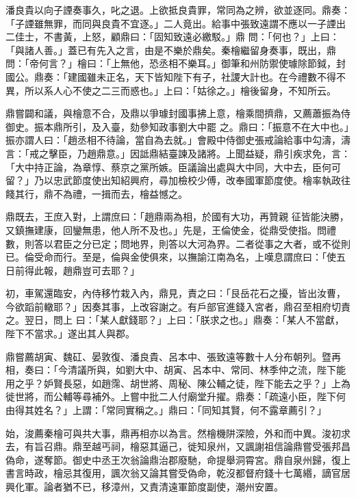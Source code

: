 \begin{pinyinscope}
 潘良貴以向子諲奏事久，叱之退。上欲抵良貴罪，常同為之辨，欲並逐同。鼎奏：「子諲雖無罪，而同與良貴不宜逐。」二人竟出。給事中張致遠謂不應以一子諲出二佳士，不書黃，上怒，顧鼎曰：「固知致遠必繳駁。」鼎
 問：「何也？」上曰：「與諸人善。」蓋已有先入之言，由是不樂於鼎矣。秦檜繼留身奏事，既出，鼎問：「帝何言？」檜曰：「上無他，恐丞相不樂耳。」御筆和州防禦使璩除節鉞，封國公。鼎奏：「建國雖未正名，天下皆知陛下有子，社謖大計也。在今禮數不得不異，所以系人心不使之二三而惑也。」上曰：「姑徐之。」檜後留身，不知所云。



 鼎嘗闢和議，與檜意不合，及鼎以爭璩封國事拂上意，檜乘間擠鼎，又薦蕭振為侍御史。振本鼎所引，及入臺，劾參知政事劉大中罷
 之。鼎曰：「振意不在大中也。」振亦謂人曰：「趙丞相不待論，當自為去就。」會殿中侍御史張戒論給事中勾濤，濤言：「戒之擊臣，乃趙鼎意。」因詆鼎結臺諫及諸將。上聞益疑，鼎引疾求免，言：「大中持正論，為章惇、蔡京之黨所嫉。臣議論出處與大中同，大中去，臣何可留？」乃以忠武節度使出知紹興府，尋加檢校少傅，改奉國軍節度使。檜率執政往餞其行，鼎不為禮，一揖而去，檜益憾之。



 鼎既去，王庶入對，上謂庶曰：「趙鼎兩為相，於國有大功，再贊親
 征皆能決勝，又鎮撫建康，回鑾無患，他人所不及也。」先是，王倫使金，從鼎受使指。問禮數，則答以君臣之分已定；問地界，則答以大河為界。二者從事之大者，或不從則已。倫受命而行。至是，倫與金使俱來，以撫諭江南為名，上嘆息謂庶曰：「使五日前得此報，趙鼎豈可去耶？」



 初，車駕還臨安，內侍移竹栽入內，鼎見，責之曰：「艮岳花石之擾，皆出汝曹，今欲蹈前轍耶？」因奏其事，上改容謝之。有戶部官進錢入宮者，鼎召至相府切責之。翌日，問上
 曰：「某人獻錢耶？」上曰：「朕求之也。」鼎奏：「某人不當獻，陛下不當求。」遂出其人與郡。



 鼎嘗薦胡寅、魏矼、晏敦復、潘良貴、呂本中、張致遠等數十人分布朝列。暨再相，奏曰：「今清議所與，如劉大中、胡寅、呂本中、常同、林季仲之流，陛下能用之乎？妒賢長惡，如趙霈、胡世將、周秘、陳公輔之徒，陛下能去之乎？」上為徙世將，而公輔等尋補外。上嘗中批二人付廟堂升擢。鼎奏：「疏遠小臣，陛下何由得其姓名？」上謂：「常同實稱之。」鼎曰：「同知其賢，何不露章薦引？」



 始，浚薦秦檜可與共大事，鼎再相亦以為言。然檜機阱深險，外和而中異。浚初求去，有旨召鼎。鼎至越丐祠，檜惡其逼己，徙知泉州，又諷謝祖信論鼎嘗受張邦昌偽命，遂奪節。御史中丞王次翁論鼎治郡廢馳，命提舉洞霄宮。鼎自泉州歸，復上書言時政，檜忌其復用，諷次翁又論其嘗受偽命，乾沒都督府錢十七萬緡，謫官居興化軍。論者猶不已，移漳州，又責清遠軍節度副使，潮州安置。




\end{pinyinscope}
